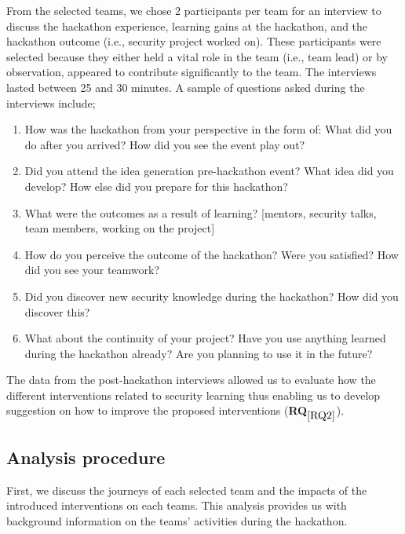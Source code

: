 \documentclass[runningheads]{llncs}
\newcommand{\hr}[1]{\textbf{RQ}$_{\ref{#1}}$}
\begin{document}
From the selected teams, we chose 2 participants per team for an interview to discuss the hackathon experience, learning gains at the hackathon, and the hackathon outcome (i.e., security project worked on). 
These participants were selected because they either held a vital role in the team (i.e., team lead) or by observation, appeared to contribute significantly to the team.
The interviews lasted between 25 and 30 minutes.
A sample of questions asked during the interviews include;
\begin{enumerate}
    \item How was the hackathon from your perspective in the form of: What did you do after you arrived? How did you see the event play out? 
    \item Did you attend the idea generation pre-hackathon event? What idea did you develop? How else did you prepare for this hackathon?
    \item What were the outcomes as a result of learning? [mentors, security talks, team members, working on the project]
    \item How do you perceive the outcome of the hackathon? Were you satisfied? How did you see your teamwork? 
    \item Did you discover new security knowledge during the hackathon? How did you discover this?
    \item What about the continuity of your project? Have you use anything learned during the hackathon already? Are you planning to use it in the future? 
\end{enumerate}
The data from the post-hackathon interviews allowed us to evaluate how the different interventions related to security learning thus enabling us to develop suggestion on how to improve the proposed interventions (\hr{RQ2}).

\subsection{Analysis procedure}\label{Sec:analysisprocedure}
First, we discuss the journeys of each selected team and the impacts of the introduced interventions on each teams. %
This analysis provides us with background information on the teams' activities during the hackathon.%
\end{document}
